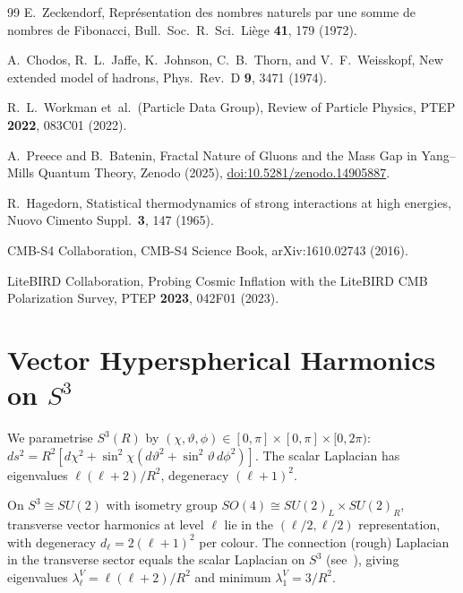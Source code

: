 \documentclass[
  aps,
  prd,
  reprint,
  superscriptaddress,
  nofootinbib,
  longbibliography,
  amsmath,
  amssymb
]{revtex4-2}
\theoremstyle{plain}
\theoremstyle{definition}
\theoremstyle{remark}
\begin{document}
\begin{thebibliography}{99}
E.~Zeckendorf,
Repr\'esentation des nombres naturels par une somme de nombres de
Fibonacci,
Bull.\ Soc.\ R.\ Sci.\ Li\`ege \textbf{41}, 179 (1972).

A.~Chodos, R.~L.~Jaffe, K.~Johnson, C.~B.~Thorn, and V.~F.~Weisskopf,
New extended model of hadrons,
Phys.\ Rev.\ D \textbf{9}, 3471 (1974).

R.~L.~Workman et~al.\ (Particle Data Group),
Review of Particle Physics,
PTEP \textbf{2022}, 083C01 (2022).

A.~Preece and B.~Batenin,
Fractal Nature of Gluons and the Mass Gap in Yang--Mills Quantum Theory,
Zenodo (2025),
\href{https://doi.org/10.5281/zenodo.14905887}{doi:10.5281/zenodo.14905887}.

R.~Hagedorn,
Statistical thermodynamics of strong interactions at high energies,
Nuovo Cimento Suppl.\ \textbf{3}, 147 (1965).

CMB-S4 Collaboration, CMB-S4 Science Book, arXiv:1610.02743 (2016).

LiteBIRD Collaboration,
Probing Cosmic Inflation with the LiteBIRD CMB Polarization Survey,
PTEP \textbf{2023}, 042F01 (2023).

\end{thebibliography}

\appendix

\section{\texorpdfstring{Vector Hyperspherical Harmonics on $S^3$}{Vector Hyperspherical Harmonics on S3}}
\label{app:harmonics}

We parametrise $S^3(R)$ by
$(\chi,\vartheta,\phi)\in[0,\pi]\times[0,\pi]\times[0,2\pi)$:
$ds^2 = R^2[d\chi^2+\sin^2\!\chi(d\vartheta^2+\sin^2\!\vartheta\,d\phi^2)]$.
The scalar Laplacian has eigenvalues $\ell(\ell+2)/R^2$,
degeneracy $(\ell+1)^2$.

On $S^3\cong SU(2)$ with isometry group $SO(4)\cong SU(2)_L\times SU(2)_R$,
transverse vector harmonics at level $\ell$ lie in the $(\ell/2,\ell/2)$
representation, with degeneracy $d_\ell=2(\ell+1)^2$ per colour.
The connection (rough) Laplacian in the transverse sector equals the
scalar Laplacian on $S^3$ (see~\cite{Camporesi1994}), giving eigenvalues
$\lambda_\ell^V = \ell(\ell+2)/R^2$ and minimum $\lambda_1^V=3/R^2$.
\end{document}

